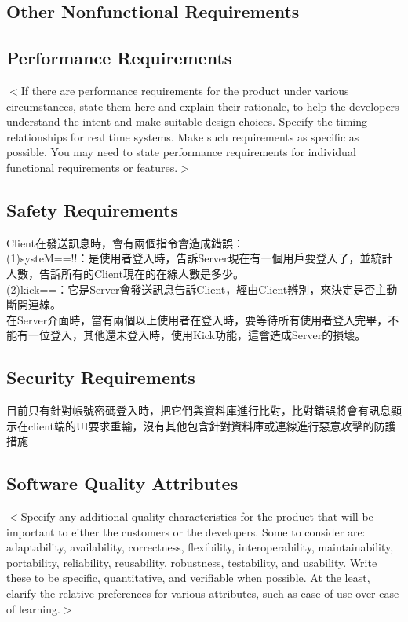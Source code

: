 \documentclass{scrreprt}
\begin{document}
\begin{CJK}{UTF8}{bkai}
\chapter{Other Nonfunctional Requirements}

\section{Performance Requirements}
$<$If there are performance requirements for the product under various 
circumstances, state them here and explain their rationale, to help the 
developers understand the intent and make suitable design choices. Specify the 
timing relationships for real time systems. Make such requirements as specific 
as possible. You may need to state performance requirements for individual 
functional requirements or features.$>$

\section{Safety Requirements}
Client在發送訊息時，會有兩個指令會造成錯誤：\\
(1)systeM==!!：是使用者登入時，告訴Server現在有一個用戶要登入了，並統計人數，告訴所有的Client現在的在線人數是多少。\\
(2)kick==：它是Server會發送訊息告訴Client，經由Client辨別，來決定是否主動斷開連線。\\
在Server介面時，當有兩個以上使用者在登入時，要等待所有使用者登入完畢，不能有一位登入，其他還未登入時，使用Kick功能，這會造成Server的損壞。\\


\section{Security Requirements}
目前只有針對帳號密碼登入時，把它們與資料庫進行比對，比對錯誤將會有訊息顯示在client端的UI要求重輸，沒有其他包含針對資料庫或連線進行惡意攻擊的防護措施

\section{Software Quality Attributes}
$<$Specify any additional quality characteristics for the product that will be 
important to either the customers or the developers. Some to consider are: 
adaptability, availability, correctness, flexibility, interoperability, 
maintainability, portability, reliability, reusability, robustness, testability, 
and usability. Write these to be specific, quantitative, and verifiable when 
possible. At the least, clarify the relative preferences for various attributes, 
such as ease of use over ease of learning.$>$


\end{CJK}
\end{document}
